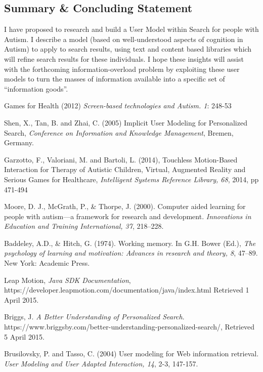 \documentclass[a4paper, 10pt]{article}
\begin{document}
\subsection{Summary \& Concluding Statement}\label{future}
I have proposed to research and build a User Model within Search for people with Autism. I describe a model (based on well-understood aspects of cognition in Autism) to apply to search results, using text and content based libraries which will refine search results for these individuals. I hope these insights will assist with the forthcoming information-overload problem by exploiting these user models to turn the masses of information available into a specific set of “information goods”. 

\begin{thebibliography}{100}

 Games for Health (2012) \textit{Screen-based technologies and Autism. 1}: 248-53

Shen, X., Tan, B. and Zhai, C. (2005) Implicit User Modeling for Personalized Search, \textit{Conference on Information and Knowledge Management}, Bremen, Germany.

 Garzotto, F., Valoriani, M. and Bartoli, L. (2014), Touchless Motion-Based Interaction for Therapy of Autistic Children, Virtual, Augmented Reality and Serious Games for Healthcare, \textit{Intelligent Systems Reference Library, 68}, 2014, pp 471-494

Moore, D. J., McGrath, P., \& Thorpe, J. (2000). Computer aided learning for people with autism—a framework for research and development. \textit{Innovations in Education and Training International, 37}, 218–228.

Baddeley, A.D., \& Hitch, G. (1974). Working memory. In G.H. Bower (Ed.), \textit{The psychology of learning and motivation: Advances in research and theory, 8}, 47–89. New York: Academic Press.

 Leap Motion, \textit{Java SDK Documentation}, \\https://developer.leapmotion.com/documentation/java/index.html Retrieved 1 April 2015.

Briggs, J. \textit{A Better Understanding of Personalized Search}. https://www.briggsby.com/better-understanding-personalized-search/, Retrieved 5 April 2015.

 Brusilovsky, P. and Tasso, C. (2004) User modeling for Web information retrieval. \textit{User Modeling and User Adapted Interaction, 14}, 2-3, 147-157.



\end{thebibliography}
\end{document}
